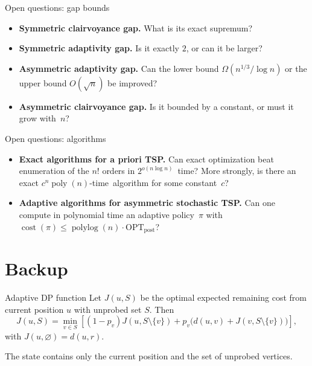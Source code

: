 \documentclass[aspectratio=169,12pt]{beamer}
\newcommand{\OPT}{\mathrm{OPT}}
\newcommand{\optpost}{\OPT_{\mathrm{post}}}
\newcommand{\cost}{\operatorname{cost}}
\newcommand{\poly}{\operatorname{poly}}
\begin{document}
\begin{frame}{Open questions: gap bounds}
  \begin{itemize}
    \setlength{\itemsep}{0.82em}
    \item \textbf{Symmetric clairvoyance gap.}
      What is its exact supremum?
    \item \textbf{Symmetric adaptivity gap.}
      Is it exactly \(2\), or can it be larger?
    \item \textbf{Asymmetric adaptivity gap.}
      Can the lower bound \(\Omega(n^{1/3}/\log n)\) or the upper bound
      \(O(\sqrt n)\) be improved?
    \item \textbf{Asymmetric clairvoyance gap.}
      Is it bounded by a constant, or must it grow with~\(n\)?
  \end{itemize}
\end{frame}

\begin{frame}{Open questions: algorithms}
  \begin{itemize}
    \setlength{\itemsep}{1.18em}
    \item \textbf{Exact algorithms for a priori TSP.}
      Can exact optimization beat enumeration of the \(n!\) orders in
      \mbox{\(2^{o(n\log n)}\) time}? More strongly, is there an exact
      \mbox{\(c^n\poly(n)\)-time algorithm} for some constant~\(c\)?
    \item \textbf{Adaptive algorithms for asymmetric stochastic TSP.}
      Can one compute in polynomial time an adaptive policy~\(\pi\) with
      \(\cost(\pi)\le\operatorname{polylog}(n)\cdot\optpost\)?
  \end{itemize}
\end{frame}

\appendix
\section{Backup}

\begin{frame}{Adaptive DP function}
  Let \(J(u,S)\) be the optimal expected remaining cost from current position
  \(u\) with unprobed set \(S\). Then
  \[
    J(u,S)
    =\min_{v\in S}
      \left[
        (1-p_v)J(u,S\setminus\{v\})
        +p_v\bigl(d(u,v)+J(v,S\setminus\{v\})\bigr)
      \right],
  \]
  with \(J(u,\varnothing)=d(u,r)\).

  \vspace{0.35cm}
  The state contains only the current position and the set of unprobed
  vertices. 
\end{frame}
\end{document}
